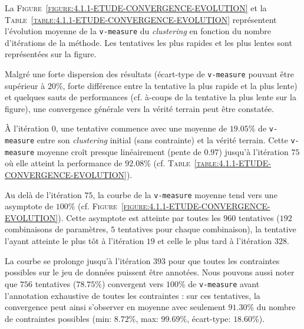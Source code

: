 			La \textsc{Figure~\ref{figure:4.1.1-ETUDE-CONVERGENCE-EVOLUTION}} et la \textsc{Table~\ref{table:4.1.1-ETUDE-CONVERGENCE-EVOLUTION}} représentent l'évolution moyenne de la \texttt{v-measure} du \textit{clustering} en fonction du nombre d'itérations de la méthode. Les tentatives les plus rapides et les plus lentes sont représentées sur la figure.
							
			Malgré une forte dispersion des résultats (écart-type de \texttt{v-measure} pouvant être supérieur à $20$\%, forte différence entre la tentative la plus rapide et la plus lente) et quelques sauts de performances (cf. à-coups de la tentative la plus lente sur la figure), une convergence générale vers la vérité terrain peut être constatée.
			
			À l'itération $0$, une tentative commence avec une moyenne de $19.05$\% de \texttt{v-measure}  entre son \textit{clustering} initial (sans contrainte) et la vérité terrain.
			Cette \texttt{v-measure} moyenne croît presque linéairement (pente de $0.97$) jusqu'à l'itération $75$ où elle atteint la performance de $92.08$\% (cf. \textsc{Table~\ref{table:4.1.1-ETUDE-CONVERGENCE-EVOLUTION}}).

			Au delà de l'itération $75$, la courbe de la \texttt{v-measure} moyenne tend vers une asymptote de $100$\% (cf. \textsc{Figure~\ref{figure:4.1.1-ETUDE-CONVERGENCE-EVOLUTION}}).
			Cette asymptote est atteinte par toutes les $960$ tentatives ($192$ combinaisons de paramètres, $5$ tentatives pour chaque combinaison), la tentative l'ayant atteinte le plus tôt à l'itération $19$ et celle le plus tard à l'itération $328$.
			
			La courbe se prolonge jusqu'à l'itération $393$ pour que toutes les contraintes possibles sur le jeu de données puissent être annotées.
			Nous pouvons aussi noter que $756$ tentatives ($78.75$\%) convergent vers $100$\% de \texttt{v-measure} avant l'annotation exhaustive de toutes les contraintes : sur ces tentatives, la convergence peut ainsi s'observer en moyenne avec seulement $91.30$\% du nombre de contraintes possibles (min: $8.72$\%, max: $99.69$\%, écart-type: $18.60$\%).
			
